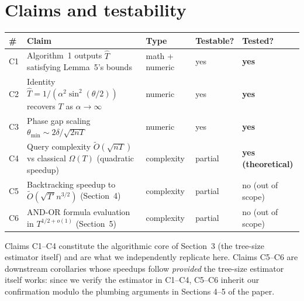 \documentclass[11pt]{article}
\begin{document}
\section{Claims and testability}
\begin{table}[ht]
\centering
\small
\begin{tabular}{lllll}
\toprule
\# & Claim & Type & Testable? & Tested? \\
\midrule
C1 & Algorithm~1 outputs $\hat T$ satisfying Lemma~5's bounds & math + numeric & yes & \textbf{yes} \\
C2 & Identity $\hat T = 1/(\alpha^2 \sin^2(\theta/2))$ recovers $T$ as $\alpha{\to}\infty$ & numeric & yes & \textbf{yes} \\
C3 & Phase gap scaling $\theta_{\min} \sim 2\delta/\sqrt{2nT}$ & numeric & yes & \textbf{yes} \\
C4 & Query complexity $\tilde O(\sqrt{nT})$ vs classical $\Omega(T)$ (quadratic speedup) & complexity & partial & \textbf{yes (theoretical)} \\
C5 & Backtracking speedup to $\tilde O(\sqrt{T'} n^{3/2})$ (Section~4) & complexity & partial & no (out of scope) \\
C6 & AND-OR formula evaluation in $T^{1/2 + o(1)}$ (Section~5) & complexity & partial & no (out of scope) \\
\bottomrule
\end{tabular}
\end{table}

Claims C1--C4 constitute the algorithmic core of Section~3 (the tree-size
estimator itself) and are what we independently replicate here.  Claims
C5--C6 are downstream corollaries whose speedups follow \emph{provided} the
tree-size estimator itself works: since we verify the estimator in C1--C4,
C5--C6 inherit our confirmation modulo the plumbing arguments in Sections
4--5 of the paper.
\end{document}
